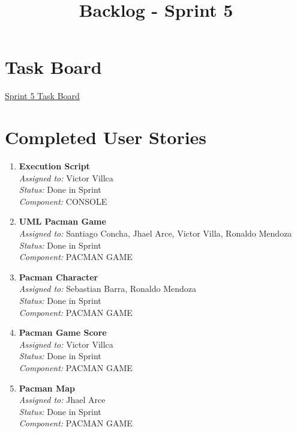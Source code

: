 \documentclass{article}
\begin{document}
    \title{Backlog - Sprint 5}
    \author{}
    \date{}
    \maketitle

    \section*{Task Board}
    \href{https://tree.taiga.io/project/joseluis-teran-coffeetime/taskboard/sprint-5-3817}{Sprint 5 Task Board}

    \section*{Completed User Stories}

    \begin{enumerate}
        \item \textbf{Execution Script} \\
        \textit{Assigned to:} Victor Villca \\
        \textit{Status:} Done in Sprint \\
        \textit{Component:} CONSOLE
        \item \textbf{UML Pacman Game} \\
        \textit{Assigned to:} Santiago Concha, Jhael Arce, Victor Villa, Ronaldo Mendoza \\
        \textit{Status:} Done in Sprint \\
        \textit{Component:} PACMAN GAME
        \item \textbf{Pacman Character} \\
        \textit{Assigned to:} Sebastian Barra, Ronaldo Mendoza \\
        \textit{Status:} Done in Sprint \\
        \textit{Component:} PACMAN GAME
        \item \textbf{Pacman Game Score} \\
        \textit{Assigned to:} Victor Villca \\
        \textit{Status:} Done in Sprint \\
        \textit{Component:} PACMAN GAME
        \item \textbf{Pacman Map} \\
        \textit{Assigned to:} Jhael Arce  \\
        \textit{Status:} Done in Sprint \\
        \textit{Component:} PACMAN GAME
    \end{enumerate}
\end{document}

